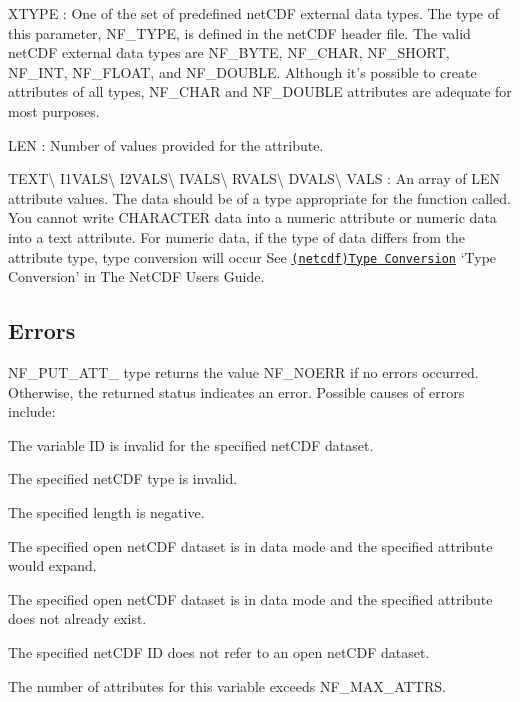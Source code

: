 {\ttfamily X\+T\+Y\+PE} \+: One of the set of predefined net\+C\+DF external data types. The type of this parameter, N\+F\+\_\+\+T\+Y\+PE, is defined in the net\+C\+DF header file. The valid net\+C\+DF external data types are N\+F\+\_\+\+B\+Y\+TE, N\+F\+\_\+\+C\+H\+AR, N\+F\+\_\+\+S\+H\+O\+RT, N\+F\+\_\+\+I\+NT, N\+F\+\_\+\+F\+L\+O\+AT, and N\+F\+\_\+\+D\+O\+U\+B\+LE. Although it’s possible to create attributes of all types, N\+F\+\_\+\+C\+H\+AR and N\+F\+\_\+\+D\+O\+U\+B\+LE attributes are adequate for most purposes.

{\ttfamily L\+EN} \+: Number of values provided for the attribute.

{\ttfamily T\+E\+XT}\textbackslash{} {\ttfamily I1\+V\+A\+LS}\textbackslash{} {\ttfamily I2\+V\+A\+LS}\textbackslash{} {\ttfamily I\+V\+A\+LS}\textbackslash{} {\ttfamily R\+V\+A\+LS}\textbackslash{} {\ttfamily D\+V\+A\+LS}\textbackslash{} {\ttfamily V\+A\+LS} \+: An array of L\+EN attribute values. The data should be of a type appropriate for the function called. You cannot write C\+H\+A\+R\+A\+C\+T\+ER data into a numeric attribute or numeric data into a text attribute. For numeric data, if the type of data differs from the attribute type, type conversion will occur See \href{netcdf.html#Type-Conversion}{\tt (netcdf)Type Conversion} ‘\+Type Conversion’ in The Net\+C\+DF Users Guide.

\subsection*{Errors }

N\+F\+\_\+\+P\+U\+T\+\_\+\+A\+T\+T\+\_\+ type returns the value N\+F\+\_\+\+N\+O\+E\+RR if no errors occurred. Otherwise, the returned status indicates an error. Possible causes of errors include\+:


\begin{DoxyItemize}
\item The variable ID is invalid for the specified net\+C\+DF dataset.
\item The specified net\+C\+DF type is invalid.
\item The specified length is negative.
\item The specified open net\+C\+DF dataset is in data mode and the specified attribute would expand.
\item The specified open net\+C\+DF dataset is in data mode and the specified attribute does not already exist.
\item The specified net\+C\+DF ID does not refer to an open net\+C\+DF dataset.
\item The number of attributes for this variable exceeds N\+F\+\_\+\+M\+A\+X\+\_\+\+A\+T\+T\+RS.
\end{DoxyItemize}

